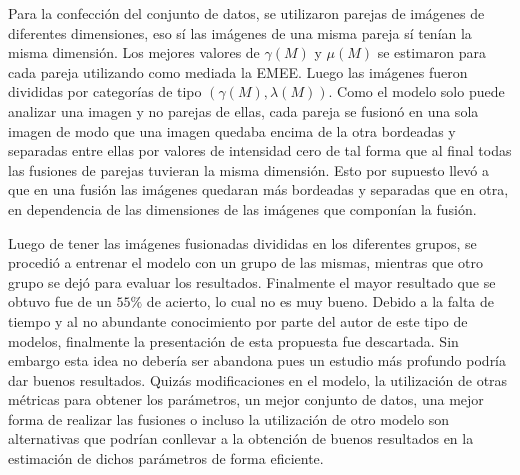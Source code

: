 Para la confecci\'on del conjunto de datos, se utilizaron parejas de im\'agenes de diferentes dimensiones, eso s\'i las im\'agenes de una misma pareja s\'i ten\'ian la misma dimensi\'on. Los mejores valores de $\gamma(M)$ y $\mu(M)$ se estimaron para cada pareja utilizando como mediada la EMEE. Luego las im\'agenes fueron divididas por categor\'ias de tipo $(\gamma(M),\lambda(M))$. Como el modelo solo puede analizar una imagen y no parejas de ellas, cada pareja se fusion\'o en una sola imagen de modo que una imagen quedaba encima de la otra bordeadas y separadas entre ellas por valores de intensidad cero de tal forma que al final todas las fusiones de parejas tuvieran la misma dimensi\'on. Esto por supuesto llev\'o a que en una fusi\'on las im\'agenes quedaran m\'as bordeadas y separadas que en otra, en dependencia de las dimensiones de las im\'agenes que compon\'ian la fusi\'on.

Luego de tener las im\'agenes fusionadas divididas en los diferentes grupos, se procedi\'o a entrenar el modelo con un grupo de las mismas, mientras que otro grupo se dej\'o para evaluar los resultados. Finalmente el mayor resultado que se obtuvo fue de un $55\%$ de acierto, lo cual no es muy bueno. Debido a la falta de tiempo y al no abundante conocimiento por parte del autor de este tipo de modelos, finalmente la presentaci\'on de esta propuesta fue descartada. Sin embargo esta idea no deber\'ia ser abandona pues un estudio m\'as profundo podr\'ia dar buenos resultados. Quiz\'as modificaciones en el modelo, la utilizaci\'on de otras m\'etricas para obtener los par\'ametros, un mejor conjunto de datos, una mejor forma de realizar las fusiones o incluso la utilizaci\'on de otro modelo son alternativas que podr\'ian conllevar a la obtenci\'on de buenos resultados en la estimaci\'on de dichos par\'ametros de forma eficiente.
